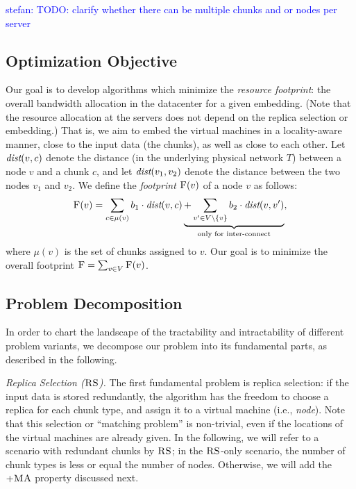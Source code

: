 \documentclass[9pt]{sigcomm-alternate}
\newcommand{\stefan}[1]{\textcolor{blue}{stefan: #1}}
\newcommand{\VirtualNodes}{\ensuremath{V}}
\newcommand{\achunk}{\ensuremath{c}}
\newcommand{\dist}{\emph{dist}}
\newcommand{\RS}{\textsc{RS}}
\newcommand{\MA}{\textsc{MA}}
\newcommand{\Cost}{\textsc{F}}
\newcommand{\Tree}{\ensuremath{T}}
\newcommand{\CostTrans}{\ensuremath{b_1}}
\newcommand{\CostCom}{\ensuremath{b_2}}
\begin{document}
\stefan{TODO: clarify whether there can be multiple chunks and or nodes per server}


\subsection{Optimization Objective}

Our goal is to develop algorithms which minimize
the \emph{resource footprint}: the overall bandwidth allocation in the datacenter for a given embedding. (Note that
the resource allocation at the servers does not depend on the replica selection or embedding.) That is,
we aim to embed the virtual machines in a locality-aware manner, close to the input data
(the chunks), as well as close to
each other. Let $\dist(v,\achunk)$ denote the distance (in the underlying physical network $\Tree$) between a node $v$ and a
chunk $\achunk$, and let $\dist(v_1,v_2)$ denote the distance between the two nodes $v_1$ and $v_2$.
We define the \emph{footprint} $\Cost(v)$ of a node $v$ as follows:
$$
\Cost(v) = \sum_{\achunk\in \mu(v)} \CostTrans \cdot \dist(v,\achunk) \underbrace{+ \sum_{v' \in \VirtualNodes\setminus\{v\}} \CostCom \cdot \dist(v,v')}_{\text{only for inter-connect}},
$$
\noindent where $\mu(v)$ is the set of chunks assigned to $v$. Our goal is to minimize the overall footprint
$\Cost=\sum_{v\in V} \Cost(v)$.


\subsection{Problem Decomposition}

In order to chart the landscape of the tractability and intractability of different
problem variants, we decompose our problem into its fundamental parts, as described in the following.

\emph{Replica Selection ($\RS$).} The first fundamental problem is replica selection:
if the input data is stored redundantly, the algorithm has the freedom to choose a replica
for each chunk type, and assign it to a virtual machine (i.e., \emph{node}). Note that this
selection or ``matching problem'' is non-trivial, even if the locations of the virtual machines
are already given. In the following, we will refer to a scenario
with redundant chunks by $\RS$; in the $\RS$-only scenario, the number of chunk types
is less or equal the number of nodes. Otherwise, we will add the $+\MA$ property discussed next.
\end{document}
